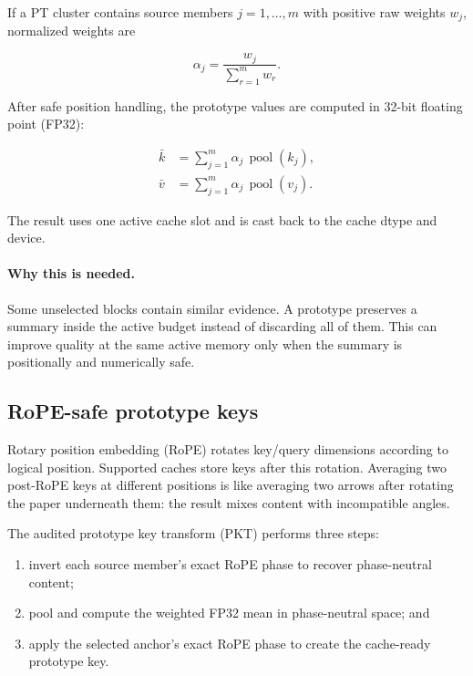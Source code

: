 \documentclass[11pt]{article}
\newcommand{\why}{\paragraph{Why this is needed.}}
\begin{document}
If a PT cluster contains source members $j=1,\ldots,m$ with positive raw weights $w_j$, normalized
weights are

\begin{equation}
  \alpha_j=\frac{w_j}{\sum_{r=1}^{m}w_r}.
\end{equation}

After safe position handling, the prototype values are computed in 32-bit floating point (FP32):

\begin{align}
  \bar{k} &= \sum_{j=1}^{m}\alpha_j\,\operatorname{pool}(k_j), \\
  \bar{v} &= \sum_{j=1}^{m}\alpha_j\,\operatorname{pool}(v_j).
\end{align}

The result uses one active cache slot and is cast back to the cache dtype and device.

\why Some unselected blocks contain similar evidence. A prototype preserves a summary inside the
active budget instead of discarding all of them. This can improve quality at the same active
memory only when the summary is positionally and numerically safe.

\subsection{RoPE-safe prototype keys}

Rotary position embedding (RoPE) rotates key/query dimensions according to logical position.
Supported caches store keys after this rotation. Averaging two post-RoPE keys at different
positions is like averaging two arrows after rotating the paper underneath them: the result mixes
content with incompatible angles.

The audited prototype key transform (PKT) performs three steps:

\begin{enumerate}
  \item invert each source member's exact RoPE phase to recover phase-neutral content;
  \item pool and compute the weighted FP32 mean in phase-neutral space; and
  \item apply the selected anchor's exact RoPE phase to create the cache-ready prototype key.
\end{enumerate}
\end{document}
